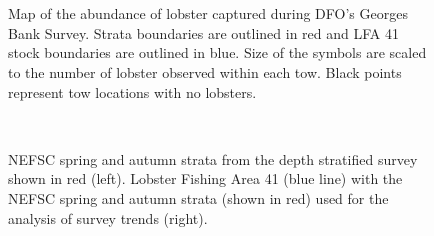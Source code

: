 \documentclass[11pt]{article}
\newcommand{\D}{.}
\newcommand{\e}{/backup/bio_data/bio.lobster/figures/} %
\begin{document}
\begin{landscape}


        \begin{figure}
        \centering
                    \\
                    \\

         \caption{Map of the abundance of lobster captured during DFO's Georges Bank Survey. Strata boundaries are outlined in red and LFA 41 stock boundaries are outlined in blue. Size of the symbols are scaled to the number of lobster observed within each tow. Black points represent tow locations with no lobsters.}
        \end{figure}
        \clearpage

\begin{figure}
\centering
        \\
\caption{NEFSC spring and autumn strata from the depth stratified survey shown in red (left). Lobster Fishing Area 41 (blue line) with the NEFSC spring and autumn strata (shown in red) used for the analysis of survey trends (right).}
\end{figure}


\end{landscape}
\end{document}
